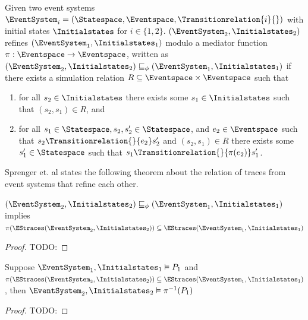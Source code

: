 \begin{definition}
    \label{def:event-system-refinement}
    Given two event systems
    $\EventSystem_i = \left( \Statespace, \Eventspace, \Transitionrelation{i}{} \right)$
    with initial states $\Initialstates$ for $i\in \lbrace1,2\rbrace$.
    $\left(\EventSystem_2, \Initialstates_2 \right)$ refines
    $\left(\EventSystem_1, \Initialstates_1 \right)$
    modulo a mediator function $\pi : \Eventspace \to \Eventspace$,
    written as 
    $\left(\EventSystem_2, \Initialstates_2 \right) \sqsubseteq_\phi
    \left(\EventSystem_1, \Initialstates_1 \right)$
    if there exists a simulation relation $R \subseteq \Eventspace \times \Eventspace$
    such that
    \begin{enumerate}
        \item for all $s_2 \in \Initialstates$ there exists some
        $s_1 \in \Initialstates$ such that $(s_2, s_1) \in R$, and
        \item for all $s_1 \in \Statespace, s_2, s_2' \in \Statespace$, and 
        $e_2 \in \Eventspace$ such that
        $s_2 \Transitionrelation{}{e_2} s_2'$ and $(s_2, s_1) \in R$
        there exists some $s_1' \in \Statespace$ such that
        $s_1 \Transitionrelation{}{\pi(e_2)} s_1'$.
    \end{enumerate}
\end{definition}

Sprenger et. al \cite{igloo} states the following theorem about the relation
of traces from event systems that refine each other.

\begin{theorem}
    \label{theo:refinement-traces}
    $\left(\EventSystem_2, \Initialstates_2 \right) \sqsubseteq_\phi
    \left(\EventSystem_1, \Initialstates_1 \right)$
    implies
    $\pi(\EStraces(\EventSystem_2, \Initialstates_2))
    \subseteq \EStraces(\EventSystem_1, \Initialstates_1)$
\end{theorem}

\begin{proof}
    \label{proof:refinement-traces}
    TODO: 
\end{proof}

\begin{lemma}
    \label{lem:refinement-property-fullfillment}
    Suppose $\EventSystem_1, \Initialstates_1 \vDash P_1$
    and $\pi(\EStraces(\EventSystem_2, \Initialstates_2)) \subseteq
    \EStraces(\EventSystem_1, \Initialstates_1)$, then
    $\EventSystem_2, \Initialstates_2 \vDash \pi^{-1}(P_1)$
\end{lemma}

\begin{proof}
    \label{proof:refinemenet-property-fullfillment}
    TODO:
\end{proof}
